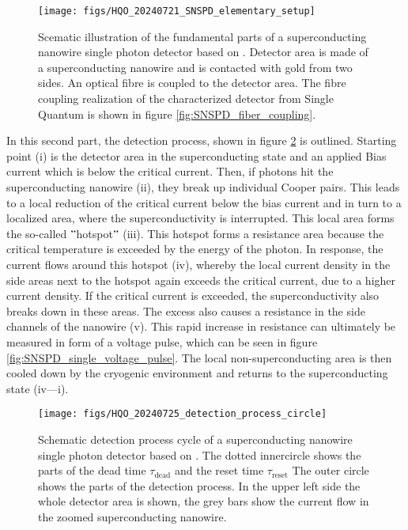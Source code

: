 \begin{figure}[!hbt]
    \centering
    \texttt{[image: figs/HQO\_20240721\_SNSPD\_elementary\_setup]}
    \caption{Scematic illustration of the fundamental parts of a superconducting nanowire single photon detector based on \cite{steudle-2012}.
    Detector area is made of a superconducting nanowire and is contacted with gold from two sides.
    An optical fibre is coupled to the detector area.
    The fibre coupling realization of the characterized detector from Single Quantum is shown in figure \ref{fig:SNSPD_fiber_coupling}.}
    \label{fig:SNSPD_rough_structure}
\end{figure}

\FloatBarrier

In this second part, the detection process, shown in figure \ref{fig: SNSPD_process} is outlined.
Starting point (i) is the detector area in the superconducting state and an applied Bias current which is below the critical current.
Then, if photons hit the superconducting nanowire (ii), they break up individual Cooper pairs.
This leads to a local reduction of the critical current below the bias current and in turn to a localized area, where
the superconductivity is interrupted.
This local area forms the so-called \("\)hotspot\("\) (iii).
This hotspot forms a resistance area because the critical temperature is exceeded by the energy of the photon.
In response, the current flows around this hotspot (iv), whereby the local current density in the side areas next to the
hotspot again exceeds the critical current, due to a higher current density.
If the critical current is exceeded, the superconductivity also breaks down in these areas.
The excess also causes a resistance in the side channels of the nanowire (v).
This rapid increase in resistance can ultimately be measured in form of a voltage pulse, which can be seen in figure \ref{fig:SNSPD_single_voltage_pulse}.
The local non-superconducting area is then cooled down by the cryogenic environment and returns to the superconducting state
(iv—i).

\begin{figure}[!hbt]
    \centering
    \texttt{[image: figs/HQO\_20240725\_detection\_process\_circle]}
    \caption{Schematic detection process cycle of a superconducting nanowire single photon detector based on \cite{singlequantum_snsd_nodate}.
    The dotted innercircle shows the parts of the dead time $\tau_{\text{dead}}$ and the reset time $\tau_{\text{reset}}$
    The outer circle shows the parts of the detection process.
    In the upper left side the whole detector area is shown, the grey bars show the current flow in the zoomed superconducting nanowire.}
    \label{fig: SNSPD_process}
\end{figure}

